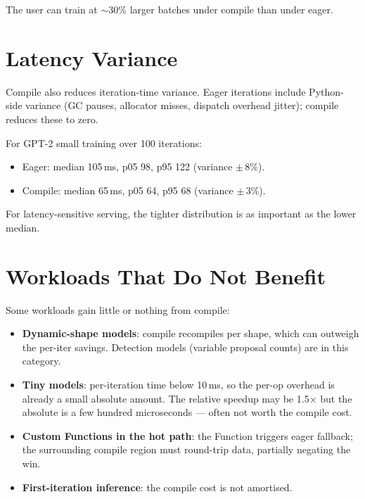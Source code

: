 The user can train at $\sim$30\% larger batches under compile
than under eager.

\section{Latency Variance}
\label{sec:graph_capture_wins:variance_latency}

Compile also reduces iteration-time variance. Eager iterations
include Python-side variance (GC pauses, allocator misses,
dispatch overhead jitter); compile reduces these to zero.

For GPT-2 small training over 100 iterations:

\begin{itemize}
  \item Eager: median 105\,ms, p05 98, p95 122 (variance
    $\pm$\,8\%).
  \item Compile: median 65\,ms, p05 64, p95 68 (variance
    $\pm$\,3\%).
\end{itemize}

For latency-sensitive serving, the tighter distribution is as
important as the lower median.

\section{Workloads That Do Not Benefit}
\label{sec:graph_capture_wins:no_benefit}

Some workloads gain little or nothing from compile:

\begin{itemize}
  \item \textbf{Dynamic-shape models}: compile recompiles per
    shape, which can outweigh the per-iter savings. Detection
    models (variable proposal counts) are in this category.
  \item \textbf{Tiny models}: per-iteration time below 10\,ms,
    so the per-op overhead is already a small absolute amount.
    The relative speedup may be 1.5$\times$ but the absolute is
    a few hundred microseconds --- often not worth the compile
    cost.
  \item \textbf{Custom Functions in the hot path}: the
    Function triggers eager fallback; the surrounding compile
    region must round-trip data, partially negating the win.
  \item \textbf{First-iteration inference}: the compile cost is
    not amortised.
\end{itemize}

